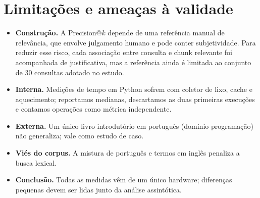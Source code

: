 \documentclass[11pt,a4paper]{article}
\begin{document}
\section{Limitações e ameaças à validade}\label{sec:limit}
\begin{itemize}[leftmargin=1.4em,itemsep=2pt]
\item \textbf{Construção.} A Precision@$k$ depende de uma referência manual de relevância, que envolve julgamento humano e pode conter subjetividade. Para reduzir esse risco, cada associação entre consulta e chunk relevante foi acompanhada de justificativa, mas a referência ainda é limitada
ao conjunto de 30 consultas adotado no estudo.
\item \textbf{Interna.} Medições de tempo em Python sofrem com coletor de lixo, cache e aquecimento;
reportamos medianas, descartamos as duas primeiras execuções e contamos operações como métrica independente.
\item \textbf{Externa.} Um único livro introdutório em português (domínio programação) não generaliza;
vale como estudo de caso.
\item \textbf{Viés do corpus.} A mistura de português e termos em inglês penaliza a busca lexical.
\item \textbf{Conclusão.} Todas as medidas vêm de um único hardware; diferenças pequenas devem ser
lidas junto da análise assintótica.
\end{itemize}

\end{document}
